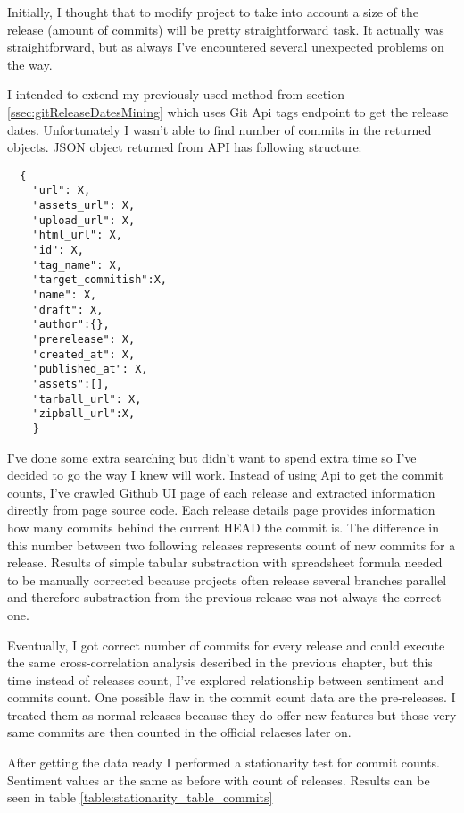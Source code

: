 Initially, I thought that to modify project to take into account a size of the release (amount of commits) will be pretty straightforward task. It actually was straightforward, but as always I've encountered several unexpected problems on the way. 

I intended to extend my previously used method from section \ref{ssec:gitReleaseDatesMining} which uses Git Api tags endpoint to get the release dates. Unfortunately I wasn't able to find number of commits in the returned objects. JSON object returned from API has following structure:

\begin{lstlisting}
  {
    "url": X,
    "assets_url": X,
    "upload_url": X,
    "html_url": X,
    "id": X,
    "tag_name": X,
    "target_commitish":X,
    "name": X,
    "draft": X,
    "author":{},
    "prerelease": X,
    "created_at": X,
    "published_at": X,
    "assets":[],
    "tarball_url": X,
    "zipball_url":X, 
    }
\end{lstlisting}

I've done some extra searching but didn't want to spend extra time so I've decided to go the way I knew will work. Instead of using Api to get the commit counts, I've crawled Github UI page of each release and extracted information directly from page source code. Each release details page provides information how many commits behind the current HEAD the commit is. The difference in this number between two following releases represents count of new commits for a release. Results of simple tabular substraction with spreadsheet formula needed to be manually corrected because projects often release several branches parallel and therefore substraction from the previous release was not always the correct one.

Eventually, I got correct number of commits for every release and could execute the same cross-correlation analysis described in the previous chapter, but this time instead of releases count, I've explored relationship between sentiment and commits count. One possible flaw in the commit count data are the pre-releases. I treated them as normal releases because they do offer new features but those very same commits are then counted in the official relaeses later on.

After getting the data ready I performed a stationarity test for commit counts. Sentiment values ar the same as before with count of releases. Results can be seen in table \ref{table:stationarity_table_commits} 

